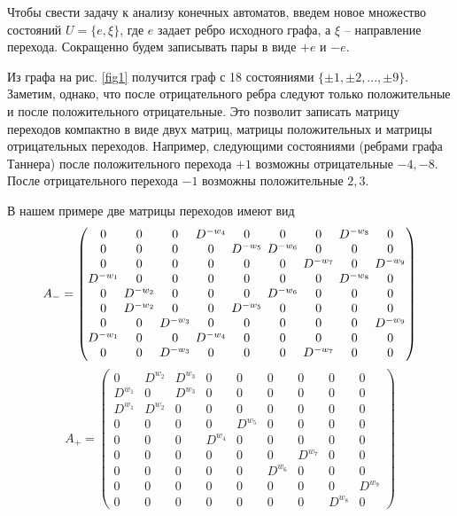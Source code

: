 Чтобы свести задачу к анализу конечных автоматов, введем новое множество состояний 
$U=\{e,\xi\}$, где  $e$ задает ребро исходного графа, а $\xi$ -- направление перехода. 
Сокращенно будем записывать пары в виде $+e$  и $-e$.   
 
Из графа на рис. \ref{fig1} получится  граф с 18 состояниями $\{ \pm 1, \pm 2,..., \pm 9\}$.
Заметим, однако, что после отрицательного  ребра следуют только положительные и после 
положительного отрицательные. Это позволит записать матрицу переходов компактно 
в виде двух матриц, матрицы положительных и матрицы отрицательных переходов.
Например, следующими состояниями (ребрами графа Таннера) после положительного перехода 
$+1$  возможны отрицательные $-4, -8$. После отрицательного перехода
$-1$  возможны положительные $2,3$. 

В нашем примере две матрицы переходов  имеют вид
 \[
 \setlength{\arraycolsep}{2.pt}
A_{-}=
\begin{pmatrix}
  0           &0          & 0     &D^{-w_4}& 0              & 0&0 & D^{-w_8}&0 \\
   0          & 0        & 0     & 0    &D^{-w_5}&D^{-w_6}&   0 &    0 &  0  \\ 
    0         &  0       &  0    & 0    &   0  &   0  &D^{-w_7}&   0  &D^{-w_9}\\ 
D^{-w_1}&  0       &    0  &   0  &   0  &   0  & 0   &D^{-w_8}&  0  \\ 
  0          &D^{-w_2}&  0    & 0    &  0   &D^{-w_6}&  0  & 0    &0    \\ 
   0         &D^{-w_2}&   0   &  0   & D^{-w_5}&   0  &  0  &  0   & 0   \\ 
   0         &0         &D^{-w_3}& 0    &  0   &   0  &0    &0     &D^{-w_9} \\ 
D^{-w_1}&0         &   0   &D^{-w_4}&  0   & 0    & 0   &   0  &0    \\ 
   0        & 0        &D^{-w_3} &   0  &    0 &  0   &D^{-w_7}    & 0    &0     
               \end{pmatrix}
\]
\[
A_{+}=
\begin{pmatrix}
0              &D^{w_2}&D^{w_3}&  0  &      0         & 0&0 &0 &0 \\
D^{w_1}& 0              &D^{w_3}&0    &      0         &0 &0 &0 &0 \\
D^{w_1}&D^{w_2}&0               & 0   &       0        &0 &0 &0 &0 \\
0              & 0             &0                &0    &D^{w_5}&0 &0 & 0& 0 \\
 0             &  0            &0                & D^{w_4}& 0 &0 &0  &0 & 0 \\
  0            &   0           & 0               &  0& 0 & 0&D^{w_7}  &0 &0  \\
   0           &    0          &  0              & 0 & 0 &D^{w_6}&0  &0 &0  \\
    0          &      0        &   0             & 0 & 0 & 0& 0& 0&  D^{w_9} \\
     0         &     0         &    0            & 0 & 0&0 & 0&  D^{w_8} &0
\end{pmatrix}
\]

